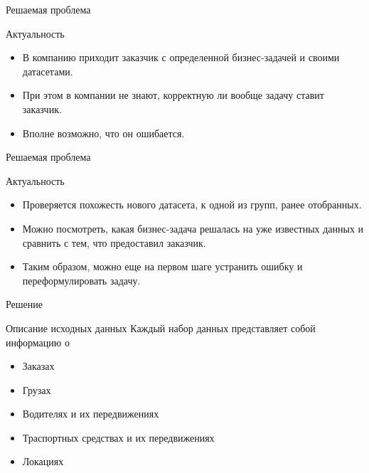 \documentclass{beamer}
\begin{document}
\begin{frame}{Решаемая проблема}
\begin{block}{Актуальность}
\begin{itemize}
\item В компанию приходит заказчик с определенной бизнес-задачей и своими датасетами.
\item При этом в компании не знают, корректную ли вообще задачу ставит заказчик.
\item Вполне возможно, что он ошибается.
\end{itemize}
\end{block}
\end{frame}

\begin{frame}{Решаемая проблема}
\begin{block}{Актуальность}
	\begin{itemize}
		\item Проверяется похожесть нового датасета, к одной из групп, ранее отобранных.
		\item Можно посмотреть, какая бизнес-задача решалась на уже известных данных и сравнить с тем, что предоставил заказчик.
		\item Таким образом, можно еще на первом шаге устранить ошибку и переформулировать задачу.
	\end{itemize}
\end{block}
\end{frame}

\begin{frame}{Решение}
\begin{block}{Описание исходных данных}
Каждый набор данных представляет собой информацию о
\begin{itemize}
\item Заказах
\item Грузах
\item Водителях и их передвижениях
\item Траспортных средствах и их передвижениях
\item Локациях
\end{itemize}
\end{block}
\end{frame}
\end{document}
